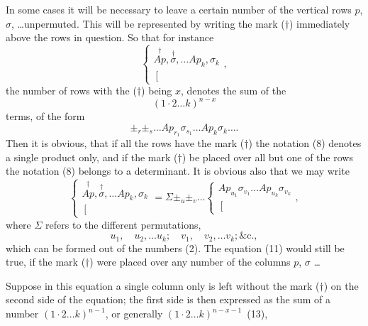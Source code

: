 \documentclass[11pt,a4paper]{book}
\begin{document}
In some cases it will be necessary to leave a certain number of the vertical
rows $p$, $\sigma$, \ldots unpermuted. This will be represented by writing the mark ($\dagger$) immediately
above the rows in question. So that for instance
\[
\left\{\begin{array}{c}
\stackrel{\dagger}{Ap}, \stackrel{\dagger}{\sigma}, \ldots Ap_k, \sigma_k \\
\left[\begin{array}{c}
\\
\end{array}\right.
\end{array}\right.
\tag{8},
\]
the number of rows with the ($\dagger$) being $x$, denotes the sum of the
\[
(1 \cdot 2 \ldots k)^{n-x}
\tag{9}
\]
terms, of the form
\[
\pm_r \pm_s \ldots Ap_{r_1}\sigma_{s_1} \ldots Ap_k\sigma_k \ldots
\tag{10}.
\]
Then it is obvious, that if all the rows have the mark ($\dagger$) the notation (8) denotes
a single product only, and if the mark ($\dagger$) be placed over all but one of the rows
the notation (8) belongs to a determinant. It is obvious also that we may write
\[
\left\{\begin{array}{c}
\stackrel{\dagger}{Ap}, \stackrel{\dagger}{\sigma}, \ldots Ap_k, \sigma_k \\
\left[\begin{array}{c}
\\
\end{array}\right.
\end{array}\right.
= \Sigma \pm_u \pm_v \ldots
\left\{\begin{array}{c}
Ap_{u_1}\sigma_{v_1} \ldots Ap_{u_k}\sigma_{v_k} \\
\left[\begin{array}{c}
\\
\end{array}\right.
\end{array}\right.
\tag{11},
\]
where $\Sigma$ refers to the different permutations,
\[
u_1, \quad u_2, \ldots u_k; \quad v_1, \quad v_2, \ldots v_k; \&\text{c.}
\tag{12},
\]
which can be formed out of the numbers (2). The equation (11) would still be true,
if the mark ($\dagger$) were placed over any number of the columns $p$, $\sigma$ \ldots

Suppose in this equation a single column only is left without the mark ($\dagger$) on
the second side of the equation; the first side is then expressed as the sum of a number
$(1 \cdot 2 \ldots k)^{n-1}$, or generally $(1 \cdot 2 \ldots k)^{n-x-1}$~(13),
\end{document}
